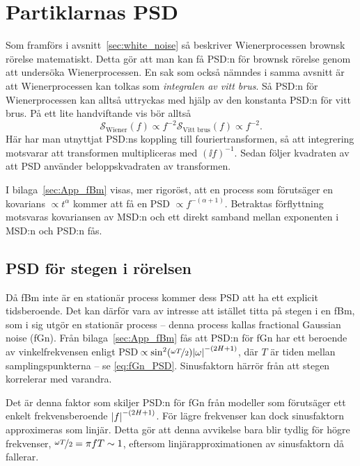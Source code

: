 \section{Partiklarnas PSD}
Som framförs i avsnitt~\ref{sec:white_noise} så beskriver Wienerprocessen brownsk rörelse matematiskt. Detta gör att man kan få PSD:n för brownsk rörelse genom att undersöka Wienerprocessen. En sak som också nämndes i samma avsnitt är att Wienerprocessen kan tolkas som \emph{integralen av vitt brus}. Så PSD:n för Wienerprocessen kan alltså uttryckas med hjälp av den konstanta PSD:n för vitt brus.
På ett lite handviftande vis bör alltså 
\begin{equation}
\mathcal{S}_\text{Wiener} (f) \propto f^{-2} \mathcal{S}_\text{Vitt brus}(f) \propto f^{-2}.
\end{equation}
Här har man utnyttjat PSD:ns koppling till fouriertransformen, så att integrering motsvarar att transformen multipliceras med $(\ii f)^{-1}$. Sedan följer kvadraten av att PSD använder beloppskvadraten av transformen. 

I bilaga~\ref{sec:App_fBm} visas, mer rigoröst, att en process som förutsäger en kovarians $\propto t^{\alpha}$ kommer att få en PSD $\propto f^{-(\alpha+1)}$. Betraktas förflyttning motsvaras kovariansen av MSD:n och ett direkt samband mellan exponenten i MSD:n och PSD:n fås.

\subsection{PSD för stegen i rörelsen}

Då fBm inte är en stationär process kommer dess PSD att ha ett explicit tidsberoende. Det kan därför vara av intresse att istället titta på stegen i en fBm, som i sig utgör en stationär process -- denna process kallas fractional Gaussian noise (fGn). 
Från bilaga~\ref{sec:App_fBm} fås att PSD:n för fGn har ett beroende av vinkelfrekvensen enligt PSD\,$\propto\sin^2(\nicefrac{\omega T}{2})\abs{\omega}^{-(2H+1)}$, där $T$ är tiden mellan samplingspunkterna -- se \eqref{eq:fGn_PSD}. 
Sinusfaktorn härrör från att stegen korrelerar med varandra.

Det är denna faktor som skiljer PSD:n för fGn från modeller som förutsäger ett enkelt frekvensberoende $\abs{f}^{-(2H+1)}$. För lägre frekvenser kan dock sinusfaktorn approximeras som linjär. Detta gör att denna avvikelse bara blir tydlig för högre frekvenser, $\nicefrac{\omega T}{2}=\pi f T \sim 1$, eftersom linjärapproximationen av sinusfaktorn då fallerar. 

